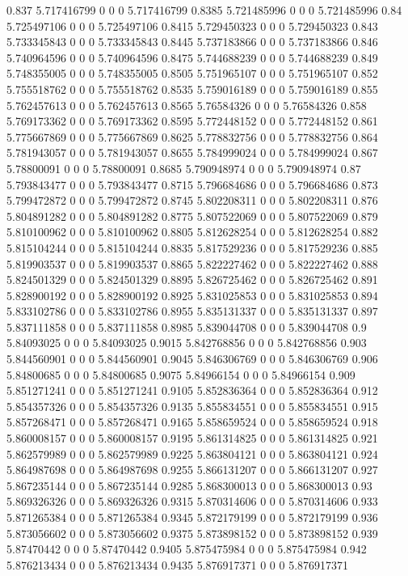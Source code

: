 {0.837 5.717416799 0 0 0 5.717416799
0.8385 5.721485996 0 0 0 5.721485996
0.84 5.725497106 0 0 0 5.725497106
0.8415 5.729450323 0 0 0 5.729450323
0.843 5.733345843 0 0 0 5.733345843
0.8445 5.737183866 0 0 0 5.737183866
0.846 5.740964596 0 0 0 5.740964596
0.8475 5.744688239 0 0 0 5.744688239
0.849 5.748355005 0 0 0 5.748355005
0.8505 5.751965107 0 0 0 5.751965107
0.852 5.755518762 0 0 0 5.755518762
0.8535 5.759016189 0 0 0 5.759016189
0.855 5.762457613 0 0 0 5.762457613
0.8565 5.76584326 0 0 0 5.76584326
0.858 5.769173362 0 0 0 5.769173362
0.8595 5.772448152 0 0 0 5.772448152
0.861 5.775667869 0 0 0 5.775667869
0.8625 5.778832756 0 0 0 5.778832756
0.864 5.781943057 0 0 0 5.781943057
0.8655 5.784999024 0 0 0 5.784999024
0.867 5.78800091 0 0 0 5.78800091
0.8685 5.790948974 0 0 0 5.790948974
0.87 5.793843477 0 0 0 5.793843477
0.8715 5.796684686 0 0 0 5.796684686
0.873 5.799472872 0 0 0 5.799472872
0.8745 5.802208311 0 0 0 5.802208311
0.876 5.804891282 0 0 0 5.804891282
0.8775 5.807522069 0 0 0 5.807522069
0.879 5.810100962 0 0 0 5.810100962
0.8805 5.812628254 0 0 0 5.812628254
0.882 5.815104244 0 0 0 5.815104244
0.8835 5.817529236 0 0 0 5.817529236
0.885 5.819903537 0 0 0 5.819903537
0.8865 5.822227462 0 0 0 5.822227462
0.888 5.824501329 0 0 0 5.824501329
0.8895 5.826725462 0 0 0 5.826725462
0.891 5.828900192 0 0 0 5.828900192
0.8925 5.831025853 0 0 0 5.831025853
0.894 5.833102786 0 0 0 5.833102786
0.8955 5.835131337 0 0 0 5.835131337
0.897 5.837111858 0 0 0 5.837111858
0.8985 5.839044708 0 0 0 5.839044708
0.9 5.84093025 0 0 0 5.84093025
0.9015 5.842768856 0 0 0 5.842768856
0.903 5.844560901 0 0 0 5.844560901
0.9045 5.846306769 0 0 0 5.846306769
0.906 5.84800685 0 0 0 5.84800685
0.9075 5.84966154 0 0 0 5.84966154
0.909 5.851271241 0 0 0 5.851271241
0.9105 5.852836364 0 0 0 5.852836364
0.912 5.854357326 0 0 0 5.854357326
0.9135 5.855834551 0 0 0 5.855834551
0.915 5.857268471 0 0 0 5.857268471
0.9165 5.858659524 0 0 0 5.858659524
0.918 5.860008157 0 0 0 5.860008157
0.9195 5.861314825 0 0 0 5.861314825
0.921 5.862579989 0 0 0 5.862579989
0.9225 5.863804121 0 0 0 5.863804121
0.924 5.864987698 0 0 0 5.864987698
0.9255 5.866131207 0 0 0 5.866131207
0.927 5.867235144 0 0 0 5.867235144
0.9285 5.868300013 0 0 0 5.868300013
0.93 5.869326326 0 0 0 5.869326326
0.9315 5.870314606 0 0 0 5.870314606
0.933 5.871265384 0 0 0 5.871265384
0.9345 5.872179199 0 0 0 5.872179199
0.936 5.873056602 0 0 0 5.873056602
0.9375 5.873898152 0 0 0 5.873898152
0.939 5.87470442 0 0 0 5.87470442
0.9405 5.875475984 0 0 0 5.875475984
0.942 5.876213434 0 0 0 5.876213434
0.9435 5.876917371 0 0 0 5.876917371
}
